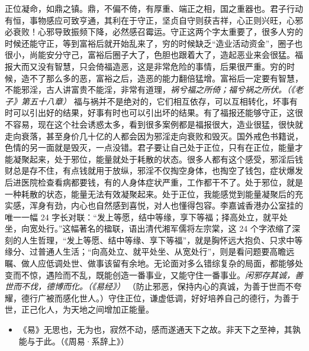 正位凝命，如鼎之镇。鼎，不偏不倚，有厚重、端正之相，国之重器也。君子行动有恒，事物感应可致亨通，其利在于守正，坚贞自守则获吉祥，心正则兴旺，心邪必衰败！心邪导致振频下降，必然感召霉运。守正这两个字太重要了，很多人穷的时候还能守正，等到富裕后就开始乱来了，穷的时候缺乏“造业活动资金”，圈子也很小，尚能安分守己，富裕后圈子大了，色胆也跟着大了，造起恶业来会很猛。福报大而又没有智慧，只会倚福造恶，这是非常危险的事情，后果很严重。穷的时候，造不了那么多的恶，富裕之后，造恶的能力翻倍猛增。富裕后一定要有智慧，不能邪淫，古人讲富贵不能淫，非常有道理，\textit{祸兮福之所倚；福兮祸之所伏。（《老子》第五十八章）} 福与祸并不是绝对的，它们相互依存，可以互相转化，坏事有时可以引出好的结果，好事有时也可以引出坏的结果。有了福报还能够守正，这很不容易，现在这个社会诱惑太多，看到很多案例都是福报很大，造业很猛，很快就走向衰落，甚至身价几十亿的人都会因为邪淫走向衰败和毁灭。国外戒色书籍说，色情的另一面就是毁灭，一点没错。君子要让自己处于正位，只有在正位，能量才能凝聚起来，处于邪位，能量就处于耗散的状态。很多人都有这个感受，邪淫后钱财总是存不住，有点钱就用于放纵，邪淫不仅掏空身体，也掏空了钱包，症状爆发后进医院检查看病都要钱，有的人身体症状严重，工作都干不了。处于邪位，就是一种耗散的状态，能量无法有效凝聚起来。处于正位，我能感觉到能量凝聚后的充实感，浑身有劲，内心也自然感到喜悦，对人也懂得包容。李嘉诚香港办公室挂的唯一一幅 24 字长对联：“发上等愿，结中等缘，享下等福；择高处立，就平处坐，向宽处行。”这幅著名的楹联，语出清代湘军儒将左宗棠，这 24 个字浓缩了深刻的人生哲理，“发上等愿、结中等缘、享下等福”，就是胸怀远大抱负、只求中等缘分、过普通人生活；“向高处立、就平处坐、从宽处行”，则是看问题要高瞻远瞩、做人应低调处世、做事该留有余地。无论面对多么错综复杂的局面，都能够处变而不惊，遇险而不乱，既能创造一番事业，又能守住一番事业。\textit{闲邪存其诚，善世而不伐，德博而化。（《易经》）} （防止邪恶，保持内心的真诚，为善于世而不夸耀，德行广被而感化世人。）守住正位，谦虚低调，好好培养自己的德行，为善于世，正己化人，为天地之间增加正能量。

\begin{itemize}\it
    \item 《易》无思也，无为也，寂然不动，感而遂通天下之故。非天下之至神，其孰能与于此。（《周易·系辞上》）
\end{itemize}

